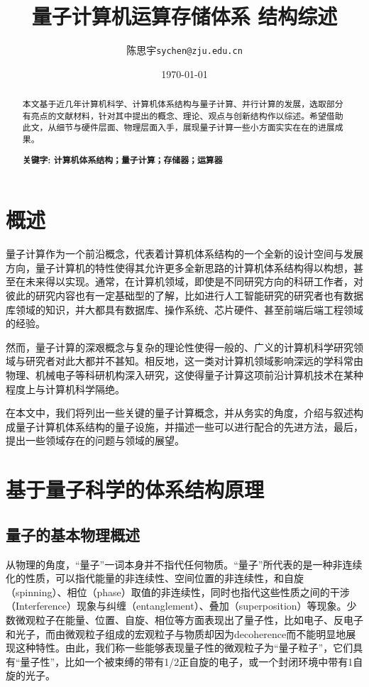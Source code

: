 \documentclass[UTF8, 11pt, a4paper]{ctexart}
\title{量子计算机运算存储体系
结构综述}
\author{陈思宇\texttt{sychen@zju.edu.cn}}
\date{\today}
\begin{document}
\maketitle


\begin{abstract}
本文基于近几年计算机科学、计算机体系结构与量子计算、并行计算的发展，选取部分有亮点的文献材料，针对其中提出的概念、理论、观点与创新结构作以综述。希望借助此文，从细节与硬件层面、物理层面入手，展现量子计算一些小方面实实在在的进展成果。

\bf{关键字}: 计算机体系结构；量子计算；存储器；运算器
\end{abstract}

\newpage
\tableofcontents

\newpage
\section{概述}
量子计算作为一个前沿概念，代表着计算机体系结构的一个全新的设计空间与发展方向，量子计算机的特性使得其允许更多全新思路的计算机体系结构得以构想，甚至在未来得以实现。通常，在计算机领域，即使是不同研究方向的科研工作者，对彼此的研究内容也有一定基础型的了解，比如进行人工智能研究的研究者也有数据库领域的知识，并大都具有数据库、操作系统、芯片硬件、甚至前端后端工程领域的经验。

然而，量子计算的深艰概念与复杂的理论性使得一般的、广义的计算机科学研究领域与研究者对此大都并不甚知。相反地，这一类对计算机领域影响深远的学科常由物理、机械电子等科研机构深入研究，这使得量子计算这项前沿计算机技术在某种程度上与计算机科学隔绝。

在本文中，我们将列出一些关键的量子计算概念，并从务实的角度，介绍与叙述构成量子计算机体系结构的量子设施，并描述一些可以进行配合的先进方法，最后，提出一些领域存在的问题与领域的展望。

\newpage
\section{基于量子科学的体系结构原理}
\subsection{量子的基本物理概述}

从物理的角度，“量子”一词本身并不指代任何物质。“量子”所代表的是一种非连续化的性质，可以指代能量的非连续性、空间位置的非连续性，和自旋（spinning）、相位（phase）取值的非连续性，同时也指代这些性质之间的干涉（Interference）现象与纠缠（entanglement）、叠加（superposition）等现象。少数微观粒子在能量、位置、自旋、相位等方面表现出了量子性，比如电子、反电子和光子\cite{shortq}，而由微观粒子组成的宏观粒子与物质却因为decoherence\cite{shortq}\cite{introq}而不能明显地展现这种特性。由此，我们称一些能够表现量子性的微观粒子为“量子粒子”，它们具有“量子性”，比如一个被束缚的带有1/2正自旋的电子，或一个封闭环境中带有1自旋的光子。
\end{document}
